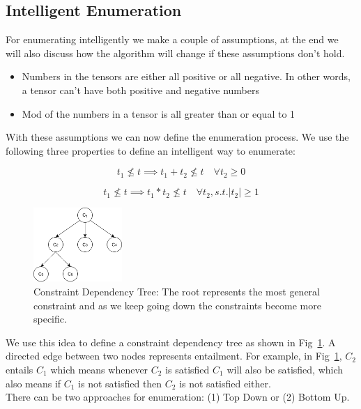 \documentclass{article}
\begin{document}
\subsection{Intelligent Enumeration}
For enumerating intelligently we make a couple of assumptions, at the end we will also discuss how the algorithm will change if these assumptions don't hold.
\begin{itemize}
\item Numbers in the tensors are either all positive or all negative. In other words, a tensor can't have both positive and negative numbers
\item Mod of the numbers in a tensor is all greater than or equal to 1
\end{itemize}

With these assumptions we can now define the enumeration process. We use the following three properties to define an intelligent way to enumerate:

\begin{equation}
t_1 \not\le t \implies t_1 + t_2 \not\le t \quad \forall t_2 \geq 0
\end{equation} 

\begin{equation}
t_1 \not\le t \implies t_1 * t_2 \not\le t \quad \forall t_2, s.t. |t_2| \geq 1
\end{equation} 

\begin{figure}[tb]
    \centering
\includegraphics[width=0.3\textwidth]{images/constraintTree.png}
    \caption{\label{fig:constraintTree} Constraint Dependency Tree: The root represents the most general constraint and as we keep going down the constraints become more specific.}
\end{figure}
We use this idea to define a constraint dependency tree as shown in Fig~\ref{fig:constraintTree}. A directed edge between two nodes represents entailment. For example, in Fig~\ref{fig:constraintTree}, $C_2$ entails $C_1$ which means whenever $C_2$ is satisfied $C_1$ will also be satisfied, which also means if $C_1$ is not satisfied then $C_2$ is not satisfied either.
\\
There can be two approaches for enumeration: (1) Top Down or (2) Bottom Up.
 
\end{document}
